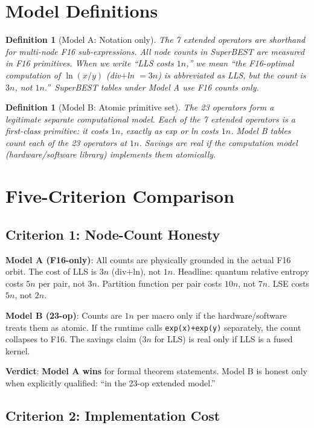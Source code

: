 \documentclass[11pt]{article}
\newtheorem{definition}[theorem]{Definition}
\begin{document}
\section{Model Definitions}

\begin{definition}[Model A: Notation only]
The 7 extended operators are \emph{shorthand} for multi-node F16 sub-expressions.
All node counts in SuperBEST are measured in F16 primitives.
When we write ``LLS costs $1n$,'' we mean ``the F16-optimal computation of $\ln(x/y)$
(div$+$ln $=3n$) is abbreviated as LLS, but the count is $3n$, not $1n$.''\
SuperBEST tables under Model A use F16 counts only.
\end{definition}

\begin{definition}[Model B: Atomic primitive set]
The 23 operators form a legitimate separate computational model.
Each of the 7 extended operators is a first-class primitive: it costs $1n$,
exactly as exp or ln costs $1n$.
Model B tables count each of the 23 operators at $1n$.
Savings are real if the computation model (hardware/software library) implements them atomically.
\end{definition}

\section{Five-Criterion Comparison}

\subsection{Criterion 1: Node-Count Honesty}

\textbf{Model A (F16-only)}: All counts are physically grounded in the actual F16 orbit.
The cost of LLS is $3n$ (div$+$ln), not $1n$.
Headline: quantum relative entropy costs $5n$ per pair, not $3n$.
Partition function per pair costs $10n$, not $7n$.
LSE costs $5n$, not $2n$.

\textbf{Model B (23-op)}: Counts are $1n$ per macro only if the hardware/software treats them
as atomic. If the runtime calls \texttt{exp(x)+exp(y)} separately, the count collapses to F16.
The savings claim ($3n$ for LLS) is real only if LLS is a fused kernel.

\textbf{Verdict}: \textbf{Model A wins} for formal theorem statements.
Model B is honest only when explicitly qualified: ``in the 23-op extended model.''

\subsection{Criterion 2: Implementation Cost}
\end{document}
